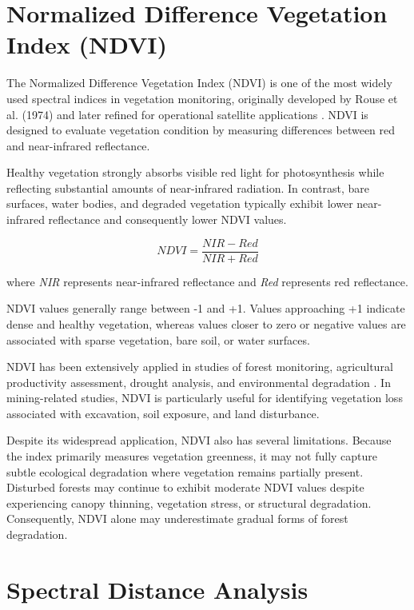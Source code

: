 \documentclass[a4paper,12pt]{report}
\begin{document}
\section{Normalized Difference Vegetation Index (NDVI)}

The Normalized Difference Vegetation Index (NDVI) is one of the most widely used spectral indices in vegetation monitoring, originally developed by Rouse et al. (1974) and later refined for operational satellite applications \citep{rouse1974ndvi,tucker1979ndvi}. NDVI is designed to evaluate vegetation condition by measuring differences between red and near-infrared reflectance.

Healthy vegetation strongly absorbs visible red light for photosynthesis while reflecting substantial amounts of near-infrared radiation. In contrast, bare surfaces, water bodies, and degraded vegetation typically exhibit lower near-infrared reflectance and consequently lower NDVI values.

\begin{equation}
NDVI = \frac{NIR - Red}{NIR + Red}
\end{equation}

where \textit{NIR} represents near-infrared reflectance and \textit{Red} represents red reflectance.

NDVI values generally range between -1 and +1. Values approaching +1 indicate dense and healthy vegetation, whereas values closer to zero or negative values are associated with sparse vegetation, bare soil, or water surfaces.

NDVI has been extensively applied in studies of forest monitoring, agricultural productivity assessment, drought analysis, and environmental degradation \citep{pettorelli2011ndvi_limits}. In mining-related studies, NDVI is particularly useful for identifying vegetation loss associated with excavation, soil exposure, and land disturbance.

Despite its widespread application, NDVI also has several limitations. Because the index primarily measures vegetation greenness, it may not fully capture subtle ecological degradation where vegetation remains partially present. Disturbed forests may continue to exhibit moderate NDVI values despite experiencing canopy thinning, vegetation stress, or structural degradation. Consequently, NDVI alone may underestimate gradual forms of forest degradation.

\section{Spectral Distance Analysis}
\end{document}
